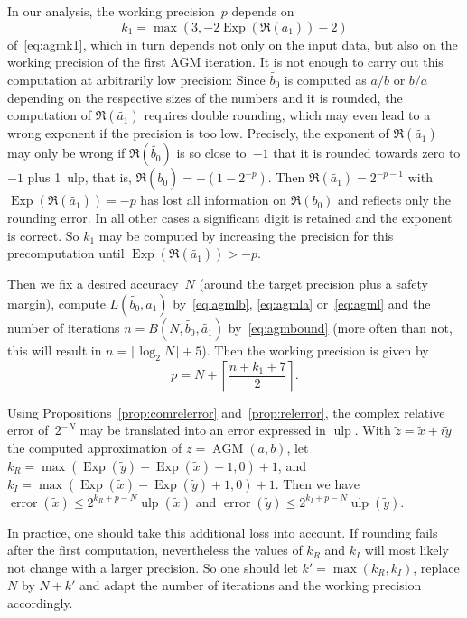 \documentclass [11pt]{article}
\newcommand {\corr}[1]{{#1}}
\newcommand {\appro}[1]{\widetilde {#1}}
\newcommand {\ulp}[1]{#1~ulp}
\newcommand {\Ulp}{{\operatorname {ulp}}}
\DeclareMathOperator{\Exp}{\operatorname {Exp}}
\newcommand{\error}{\operatorname {error}}
\renewcommand {\leq}{\leqslant}
\newcommand {\AGM}{\operatorname{AGM}}
\begin{document}
In our analysis, the working precision~$p$ depends on
\[
k_1 = \max (3, - 2 \Exp (\Re (\appro {a_1})) - 2)
\]
of~\eqref {eq:agmk1}, which in turn depends not only on the input data,
but also on the working precision of the first AGM iteration. It is not
enough to carry out this computation at arbitrarily low precision:
Since $\appro {b_0}$ is computed as $a / b$ or $b / a$ depending on the
respective sizes of the numbers and it is rounded, the computation
of $\Re (\appro {a_1})$ requires double rounding, which may even lead to a
wrong exponent if the precision is too low. Precisely, the exponent of
$\Re (\appro {a_1})$ may only be wrong if $\Re (\appro {b_0})$ is so close
to~$-1$ that it is rounded towards zero to $-1$ plus \ulp {1}, that is,
$\Re (\appro {b_0}) = - (1 - 2^{-p})$. Then
$\Re (\appro {a_1}) = 2^{- p - 1}$ with $\Exp (\Re (\appro {a_1})) = -p$
has lost all information on $\Re (b_0)$ and reflects only the rounding
error. In all other cases a significant digit is retained and the exponent
is correct. So $k_1$ may be computed by increasing the precision for
this precomputation until $\Exp (\Re (\appro {a_1})) > -p$.

Then we fix a desired accuracy~$N$ (around the target precision plus a
safety margin), compute $L (\appro {b_0}, \appro {a_1})$
by~\eqref {eq:agmlb}, \eqref {eq:agmla} or~\eqref {eq:agml} and
the number of iterations
$n = B (N, \appro {b_0}, \appro {a_1})$ by~\eqref {eq:agmbound}
(more often than not, this will result in $n = \lceil \log_2 N \rceil + 5$).
Then the working precision is given by
\[
p = N + \left\lceil \frac {n + k_1 + 7}{2} \right\rceil.
\]

Using Propositions~\ref {prop:comrelerror} and~\ref {prop:relerror}, the
complex relative error of~$2^{-N}$ may be translated into an error
expressed in $\Ulp$.
With $\appro {z} = \appro x + i \appro y$
the computed approximation of $\corr {z} = \AGM (a, b)$, let
$k_R = \max (\Exp (\appro y) - \Exp (\appro x) + 1, 0) + 1$, and
$k_I = \max (\Exp (\appro x) - \Exp (\appro y) + 1, 0) + 1$.
Then we have
$\error (\appro x) \leq 2^{k_R + p - N} \Ulp (\appro x)$ and
$\error (\appro y) \leq 2^{k_I + p - N} \Ulp (\appro y)$.

In practice, one should take this additional loss into account.
If rounding fails after the first computation, nevertheless the values of
$k_R$ and $k_I$ will most likely not change with a larger precision.
So one should let $k' = \max (k_R, k_I)$, replace $N$ by $N + k'$
and adapt the number of iterations and the working precision accordingly.
\end{document}
